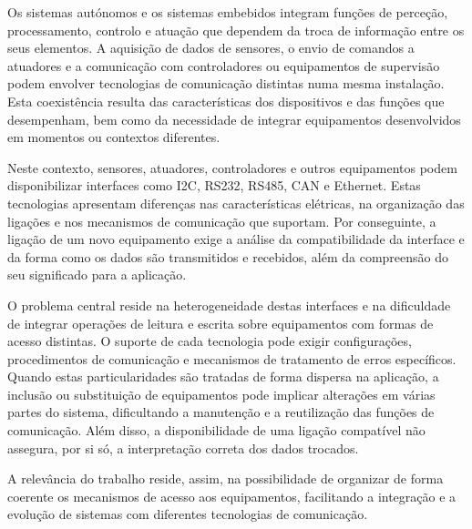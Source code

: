Os sistemas autónomos e os sistemas embebidos integram funções de
perceção, processamento, controlo e atuação que dependem da troca de
informação entre os seus elementos. A aquisição de dados de sensores,
o envio de comandos a atuadores e a comunicação com controladores ou
equipamentos de supervisão podem envolver tecnologias de comunicação
distintas numa mesma instalação. Esta coexistência resulta das
características dos dispositivos e das funções que desempenham, bem
como da necessidade de integrar equipamentos desenvolvidos em momentos
ou contextos diferentes.

Neste contexto, sensores, atuadores, controladores e outros equipamentos
podem disponibilizar interfaces como I2C, RS232, RS485, CAN e Ethernet.
Estas tecnologias apresentam diferenças nas características elétricas,
na organização das ligações e nos mecanismos de comunicação que
suportam. Por conseguinte, a ligação de um novo equipamento exige a
análise da compatibilidade da interface e da forma como os dados são
transmitidos e recebidos, além da compreensão do seu significado para
a aplicação.

O problema central reside na heterogeneidade destas interfaces e na
dificuldade de integrar operações de leitura e escrita sobre equipamentos
com formas de acesso distintas. O suporte de cada tecnologia pode exigir
configurações, procedimentos de comunicação e mecanismos de tratamento
de erros específicos. Quando estas particularidades são tratadas de
forma dispersa na aplicação, a inclusão ou substituição de equipamentos
pode implicar alterações em várias partes do sistema, dificultando a
manutenção e a reutilização das funções de comunicação. Além disso, a
disponibilidade de uma ligação compatível não assegura, por si só, a
interpretação correta dos dados trocados.

A relevância do trabalho reside, assim, na possibilidade de organizar de
forma coerente os mecanismos de acesso aos equipamentos, facilitando a
integração e a evolução de sistemas com diferentes tecnologias de
comunicação.

